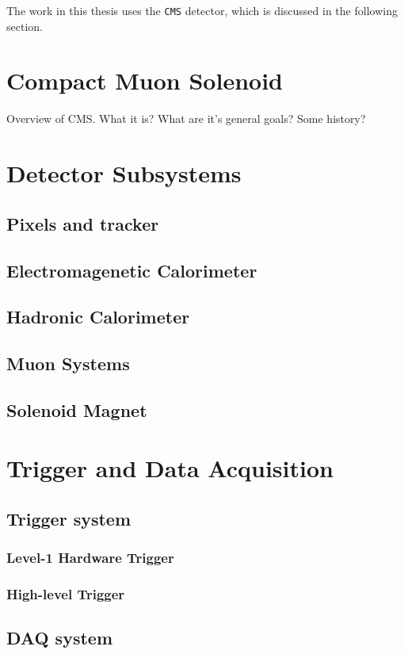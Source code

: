 The work in this thesis uses the \texttt{CMS} detector, which is discussed in 
the following section.


\section{Compact Muon Solenoid}  %
\label{sec:detector_overview}

Overview of CMS. What it is? What are it's general goals? Some history?


\section{Detector Subsystems}  %
\label{sec:detector_subsystems}

\subsection{Pixels and tracker}

\subsection{Electromagenetic Calorimeter}

\subsection{Hadronic Calorimeter}

\subsection{Muon Systems}

\subsection{Solenoid Magnet}


\section{Trigger and Data Acquisition}  %
\label{sec:detector_daq}

\subsection{Trigger system}

\subsubsection{Level-1 Hardware Trigger}

\subsubsection{High-level Trigger}

\subsection{DAQ system}

